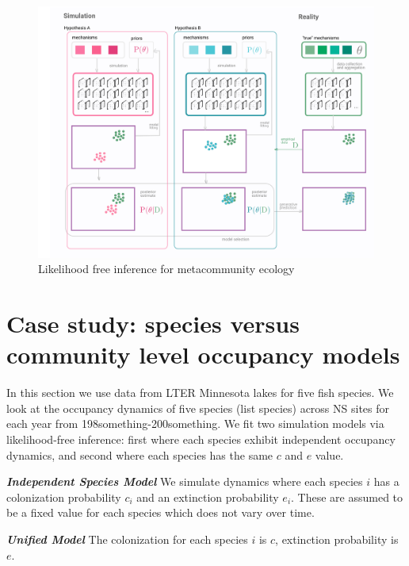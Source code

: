 \documentclass[10pt,oneside]{article}
\makeatletter
\def\maxwidth{\ifdim\Gin@nat@width>\linewidth\linewidth
\else\Gin@nat@width\fi}
\let\Oldincludegraphics\includegraphics
\renewcommand{\includegraphics}[1]{\Oldincludegraphics[width=\maxwidth]{#1}}
\makeatother
\begin{document}
\begin{figure}
\hypertarget{fig:information}{%
\centering
\includegraphics{./figures/likelihoodfreeinference.png}
\caption{Likelihood free inference for metacommunity
ecology}\label{fig:information}
}
\end{figure}

\hypertarget{case-study-species-versus-community-level-occupancy-models}{%
\section{Case study: species versus community level occupancy
models}\label{case-study-species-versus-community-level-occupancy-models}}

In this section we use data from LTER Minnesota lakes for five fish
species. We look at the occupancy dynamics of five species (list
species) across NS sites for each year from 198something-200something.
We fit two simulation models via likelihood-free inference: first where
each species exhibit independent occupancy dynamics, and second where
each species has the same \(c\) and \(e\) value.

\textbf{\emph{Independent Species Model}} We simulate dynamics where
each species \(i\) has a colonization probability \(c_i\) and an
extinction probability \(e_i\). These are assumed to be a fixed value
for each species which does not vary over time.

\textbf{\emph{Unified Model}} The colonization for each species \(i\) is
\(c\), extinction probability is \(e\).
\end{document}
